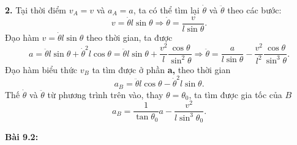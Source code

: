 \textbf{2.} Tại thời điểm $v_A=v$ và $a_A=a$, ta có thể tìm lại $\dot{\theta}$ và $\ddot{\theta}$ theo các bước:
\begin{equation} \label{eq1_rectangle_collision}
    v=\dot{\theta} l \sin \theta \Rightarrow \dot{\theta}= \dfrac{v}{l \sin \theta}.
\end{equation}
Đạo hàm $v=\dot{\theta} l \sin \theta$ theo thời gian, ta được
\begin{equation} \label{eq2_rectangle_collision}
    a = \ddot{\theta} l \sin \theta + \dot{\theta}^2 l \cos \theta = \ddot{\theta} l \sin \theta + \dfrac{v^2}{l} \dfrac{\cos \theta}{\sin^2 \theta} \Rightarrow \ddot{\theta}= \dfrac{a}{l \sin \theta} - \dfrac{v^2}{l^2} \dfrac{\cos \theta}{\sin^3 \theta}.
\end{equation}
Đạo hàm biểu thức $v_B$ ta tìm được ở phần \textbf{a,} theo thời gian
\begin{equation} \label{eq3_rectangle_collision}
    a_B = \ddot{\theta} l \cos \theta - \dot{\theta}^2 l \sin \theta.
\end{equation}
Thế $\dot{\theta}$ và $\ddot{\theta}$ từ phương trình trên vào, thay $\theta=\theta_0$, ta tìm được gia tốc của $B$
\begin{equation} \label{eq4_rectangle_collision}
    a_B = \dfrac{1}{\tan \theta_0} a - \dfrac{v^2}{l \sin^3 \theta_0}.
\end{equation}


\textbf{Bài 9.2:}